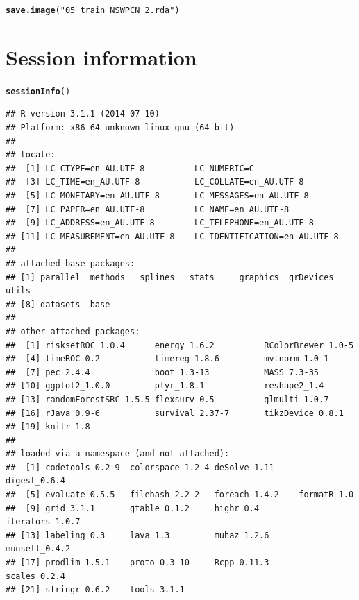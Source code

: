 \documentclass{article}\usepackage[]{graphicx}\usepackage[]{color}
\makeatletter
\newcommand{\hlstr}[1]{\textcolor[rgb]{0.192,0.494,0.8}{#1}}%
\newcommand{\hlstd}[1]{\textcolor[rgb]{0.345,0.345,0.345}{#1}}%
\newcommand{\hlkwd}[1]{\textcolor[rgb]{0.737,0.353,0.396}{\textbf{#1}}}%
\newenvironment{kframe}{%
 \def\at@end@of@kframe{}%
 \ifinner\ifhmode%
  \def\at@end@of@kframe{\end{minipage}}%
  \begin{minipage}{\columnwidth}%
 \fi\fi%
 \def\FrameCommand##1{\hskip\@totalleftmargin \hskip-\fboxsep
 \colorbox{shadecolor}{##1}\hskip-\fboxsep
     \hskip-\linewidth \hskip-\@totalleftmargin \hskip\columnwidth}%
 \MakeFramed {\advance\hsize-\width
   \@totalleftmargin\z@ \linewidth\hsize
   \@setminipage}}%
 {\par\unskip\endMakeFramed%
 \at@end@of@kframe}
\newenvironment{knitrout}{}{} %
\makeatother
\begin{document}
\begin{knitrout}
\color{fgcolor}\begin{kframe}
\begin{alltt}
\hlkwd{save.image}\hlstd{(}\hlstr{"05_train_NSWPCN_2.rda"}\hlstd{)}
\end{alltt}
\end{kframe}
\end{knitrout}

\section{Session information}
\begin{knitrout}
\color{fgcolor}\begin{kframe}
\begin{alltt}
\hlkwd{sessionInfo}\hlstd{()}
\end{alltt}
\begin{verbatim}
## R version 3.1.1 (2014-07-10)
## Platform: x86_64-unknown-linux-gnu (64-bit)
## 
## locale:
##  [1] LC_CTYPE=en_AU.UTF-8          LC_NUMERIC=C                 
##  [3] LC_TIME=en_AU.UTF-8           LC_COLLATE=en_AU.UTF-8       
##  [5] LC_MONETARY=en_AU.UTF-8       LC_MESSAGES=en_AU.UTF-8      
##  [7] LC_PAPER=en_AU.UTF-8          LC_NAME=en_AU.UTF-8          
##  [9] LC_ADDRESS=en_AU.UTF-8        LC_TELEPHONE=en_AU.UTF-8     
## [11] LC_MEASUREMENT=en_AU.UTF-8    LC_IDENTIFICATION=en_AU.UTF-8
## 
## attached base packages:
## [1] parallel  methods   splines   stats     graphics  grDevices utils    
## [8] datasets  base     
## 
## other attached packages:
##  [1] risksetROC_1.0.4      energy_1.6.2          RColorBrewer_1.0-5   
##  [4] timeROC_0.2           timereg_1.8.6         mvtnorm_1.0-1        
##  [7] pec_2.4.4             boot_1.3-13           MASS_7.3-35          
## [10] ggplot2_1.0.0         plyr_1.8.1            reshape2_1.4         
## [13] randomForestSRC_1.5.5 flexsurv_0.5          glmulti_1.0.7        
## [16] rJava_0.9-6           survival_2.37-7       tikzDevice_0.8.1     
## [19] knitr_1.8            
## 
## loaded via a namespace (and not attached):
##  [1] codetools_0.2-9  colorspace_1.2-4 deSolve_1.11     digest_0.6.4    
##  [5] evaluate_0.5.5   filehash_2.2-2   foreach_1.4.2    formatR_1.0     
##  [9] grid_3.1.1       gtable_0.1.2     highr_0.4        iterators_1.0.7 
## [13] labeling_0.3     lava_1.3         muhaz_1.2.6      munsell_0.4.2   
## [17] prodlim_1.5.1    proto_0.3-10     Rcpp_0.11.3      scales_0.2.4    
## [21] stringr_0.6.2    tools_3.1.1
\end{verbatim}
\end{kframe}
\end{knitrout}
\end{document}

